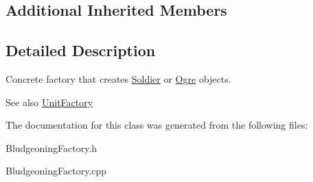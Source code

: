 \subsection*{Additional Inherited Members}


\subsection{Detailed Description}
Concrete factory that creates \hyperlink{class_soldier}{Soldier} or \hyperlink{class_ogre}{Ogre} objects. 

\begin{DoxySeeAlso}{See also}
\hyperlink{class_unit_factory}{Unit\+Factory} 
\end{DoxySeeAlso}


The documentation for this class was generated from the following files\+:\begin{DoxyCompactItemize}
\item 
Bludgeoning\+Factory.\+h\item 
Bludgeoning\+Factory.\+cpp\end{DoxyCompactItemize}
